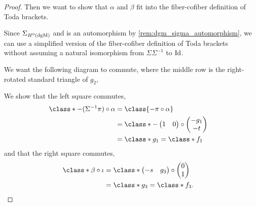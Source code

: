 \begin{proof}
    Then we want to show that \( \alpha \) and \( \beta \) fit into the fiber-cofiber definition of Toda brackets.

    Since \( \Sigma_{H^0(\operatorname{dgM})} \) and is an automorphism by \autoref{rem:dgm_sigma_automorphism}, we can use a simplified version of the fiber-cofiber definition of Toda brackets without assuming a natural isomorphism from \( \Sigma \Sigma^{-1} \) to \( \operatorname{Id} \).

    We want the following diagram to commute, where the middle row is the right-rotated standard triangle of \( g_2 \),
    \begin{center}
    \end{center}

    We show that the left square commutes,
    \begin{align*}
        \class*{- (\Sigma^{-1} \pi) \circ \alpha} &= \class{- \pi \circ \alpha} \\
        &=
        \class*{
            -
            \begin{pmatrix}
                1 & 0
            \end{pmatrix}
            \circ
            \begin{pmatrix}
                - g_1 \\
                - t
            \end{pmatrix} 
        } \\
        &= \class*{g_1} = \class*{f_1}
    \end{align*}
    and that the right square commutes,
    \begin{align*}
        \class*{\beta \circ \iota} &=
        \class*{
            \begin{pmatrix}
                - s & g_3
            \end{pmatrix}
            \circ
            \begin{pmatrix}
                0 \\
                1
            \end{pmatrix}
         } \\
        &= \class*{g_3} = \class*{f_3}.
    \end{align*}


\end{proof}

